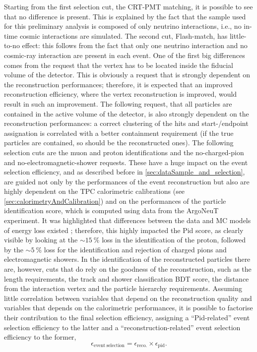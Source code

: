 Starting from the first selection cut, the CRT-PMT matching, it is possible to see that no difference is present. This is explained by the fact that the sample used for this preliminary analysis is composed of only neutrino interactions, i.e., no in-time cosmic interactions are simulated. The second cut, Flash-match, has little-to-no effect: this follows from the fact that only one neutrino interaction and no cosmic-ray interaction are present in each event. One of the first big differences comes from the request that the vertex has to be located inside the fiducial volume of the detector. This is obviously a request that is strongly dependent on the reconstruction performances; therefore, it is expected that an improved reconstruction efficiency, where the vertex reconstruction is improved, would result in such an improvement. The following request, that all particles are contained in the active volume of the detector, is also strongly dependent on the reconstruction performances: a correct clustering of the hits and start-/endpoint assignation is correlated with a better containment requirement (if the true particles are contained, so should be the reconstructed ones). The following selection cuts are the muon and proton identifications and the no-charged-pion and no-electromagnetic-shower requests. These have a huge impact on the event selection efficiency, and as described before in \autoref{sec:dataSample_and_selection}, are guided not only by the performances of the event reconstruction but also are highly dependent on the TPC calorimetric calibrations (see \autoref{sec:calorimetryAndCalibration}) and on the performances of the particle identification score, which is computed using data from the ArgoNeuT experiment. It was highlighted that differences between the data and MC models of energy loss existed \cite{Sommaggio:2025_updatesdEdxStudies}; therefore, this highly impacted the Pid score, as clearly visible by looking at the ${\sim}\SI{15}{\percent}$ loss in the identification of the proton, followed by the ${\sim}\SI{5}{\percent}$ loss for the identification and rejection of charged pions and electromagnetic showers. In the identification of the reconstructed particles there are, however, cuts that do rely on the goodness of the reconstruction, such as the length requirements, the track and shower classification BDT score, the distance from the interaction vertex and the particle hierarchy requirements. Assuming little correlation between variables that depend on the reconstruction quality and variables that depends on the calorimetric performances, it is possible to factorise their contribution to the final selection efficiency, assigning a ``Pid-related'' event selection efficiency to the latter and a ``reconstruction-related'' event selection efficiency to the former, \begin{equation}
    \epsilon_\mathrm{event\ selection} = \epsilon_\mathrm{reco.} \times \epsilon_\mathrm{pid}.
\end{equation} 

